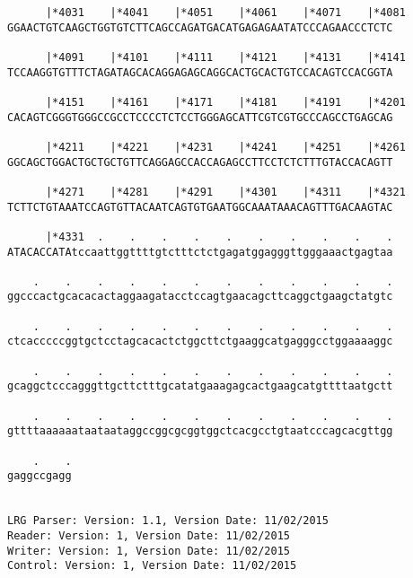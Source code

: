 \documentclass{article}
\begin{document}
\begin{Verbatim}
      |*4031    |*4041    |*4051    |*4061    |*4071    |*4081
GGAACTGTCAAGCTGGTGTCTTCAGCCAGATGACATGAGAGAATATCCCAGAACCCTCTC
                                                            
      |*4091    |*4101    |*4111    |*4121    |*4131    |*4141
TCCAAGGTGTTTCTAGATAGCACAGGAGAGCAGGCACTGCACTGTCCACAGTCCACGGTA
                                                            
      |*4151    |*4161    |*4171    |*4181    |*4191    |*4201
CACAGTCGGGTGGGCCGCCTCCCCTCTCCTGGGAGCATTCGTCGTGCCCAGCCTGAGCAG
                                                            
      |*4211    |*4221    |*4231    |*4241    |*4251    |*4261
GGCAGCTGGACTGCTGCTGTTCAGGAGCCACCAGAGCCTTCCTCTCTTTGTACCACAGTT
                                                            
      |*4271    |*4281    |*4291    |*4301    |*4311    |*4321
TCTTCTGTAAATCCAGTGTTACAATCAGTGTGAATGGCAAATAAACAGTTTGACAAGTAC
                                                            
      |*4331  .    .    .    .    .    .    .    .    .    .
ATACACCATAtccaattggttttgtctttctctgagatggagggttgggaaactgagtaa
                                                            
    .    .    .    .    .    .    .    .    .    .    .    .
ggcccactgcacacactaggaagatacctccagtgaacagcttcaggctgaagctatgtc
                                                            
    .    .    .    .    .    .    .    .    .    .    .    .
ctcacccccggtgctcctagcacactctggcttctgaaggcatgagggcctggaaaaggc
                                                            
    .    .    .    .    .    .    .    .    .    .    .    .
gcaggctcccagggttgcttctttgcatatgaaagagcactgaagcatgttttaatgctt
                                                            
    .    .    .    .    .    .    .    .    .    .    .    .
gttttaaaaaataataataggccggcgcggtggctcacgcctgtaatcccagcacgttgg
                                                            
    .    .
gaggccgagg
          
          
LRG Parser: Version: 1.1, Version Date: 11/02/2015
Reader: Version: 1, Version Date: 11/02/2015
Writer: Version: 1, Version Date: 11/02/2015
Control: Version: 1, Version Date: 11/02/2015
\end{Verbatim}
\end{document}
